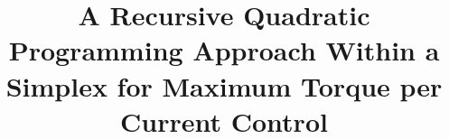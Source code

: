 \title{A Recursive Quadratic Programming Approach Within a Simplex for
Maximum Torque per Current Control}
\author{}
\date{}

\newcommand{\PaperAbstract}{%
This paper presents a recursive algorithm to solve quadratic minimization
problems constrained to the convex hull of vertices defining a simplex. The
method targets the minimization of copper losses in electric machines by
optimizing stator currents under the Maximum Torque Per Ampere (MTPA)
criterion. The quadratic form minimizes power loss given by
\(x^\top Qx\), where \(Q\) is the diagonal matrix of stator resistances and
\(x\) is the current vector constrained within the feasible region defined by
the convex hull. We discuss the theoretical background and provide the
implementation details of the recursive solver, highlighting its advantages
in guaranteeing feasibility and optimality within the simplex domain.}

\newcommand{\PaperKeywords}{Maximum Torque Per Ampere, quadratic programming,
convex optimization, recursive algorithms, electric machine control.}
\newif\ifshowglossary
\showglossaryfalse
